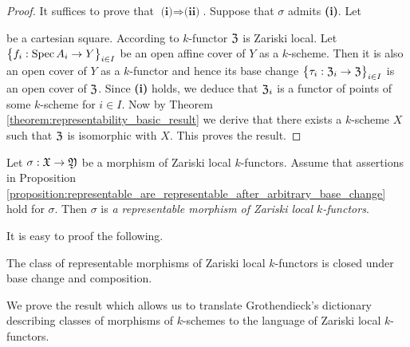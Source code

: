 \begin{proof}
It suffices to prove that $\textbf{(i)}\Rightarrow \textbf{(ii)}$. Suppose that $\sigma$ admits \textbf{(i)}. Let
\begin{center}
\end{center}
be a cartesian square. According to {\cite[Theorem 2.12]{Sheaves}} $k$-functor ${\mathfrak Z}$ is Zariski local. Let $\big\{f_i:\mathrm{Spec}\, A_i\rightarrow Y\big\}_{i\in I}$ be an open affine cover of $Y$ as a $k$-scheme. Then it is also an open cover of $Y$ as a $k$-functor and hence its base change $\big\{\tau_i:{\mathfrak Z}_i\rightarrow {\mathfrak Z}\big\}_{i\in I}$ is an open cover of ${\mathfrak Z}$. Since \textbf{(i)} holds, we deduce that ${\mathfrak Z}_i$ is a functor of points of some $k$-scheme for $i\in I$. Now by Theorem \ref{theorem:representability_basic_result} we derive that there exists a $k$-scheme $X$ such that ${\mathfrak Z}$ is isomorphic with $X$. This proves the result.
\end{proof}

\begin{definition}
Let $\sigma:{\mathfrak X}\rightarrow {\mathfrak Y}$ be a morphism of Zariski local $k$-functors. Assume that assertions in Proposition \ref{proposition:representable_are_representable_after_arbitrary_base_change} hold for $\sigma$. Then $\sigma$ is \textit{a representable morphism of Zariski local $k$-functors}.
\end{definition}
\noindent
It is easy to proof the following. 

\begin{fact}\label{fact:representable_morphisms_under_base_change_and_composition}
The class of representable morphisms of Zariski local $k$-functors is closed under base change and composition.
\end{fact}
\noindent
We prove the result which allows us to translate Grothendieck's dictionary describing classes of morphisms of $k$-schemes to the language of Zariski local $k$-functors.

